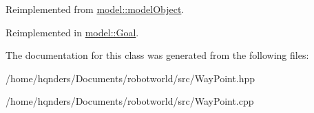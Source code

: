 Reimplemented from \hyperlink{class_model_1_1_model_object_a9db00b9150a932a1637e425f24c0bdf0}{model\+::\+model\+Object}.



Reimplemented in \hyperlink{class_model_1_1_goal_a3a2482cbc274b38165125a75be970f29}{model\+::\+Goal}.



The documentation for this class was generated from the following files\+:\begin{DoxyCompactItemize}
\item 
/home/hqnders/\+Documents/robotworld/src/Way\+Point.\+hpp\item 
/home/hqnders/\+Documents/robotworld/src/Way\+Point.\+cpp\end{DoxyCompactItemize}
